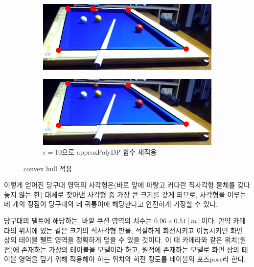 \documentclass[10pt]{oblivoir}
\newcommand{\textss}[1]{\scriptsize#1\normalsize}
\begin{document}
\begin{figure}[ht]
    \centering
    \begin{subfigure}{8cm}
        \includegraphics[width=\textwidth]{img/billiards-table-low-angle-convex.png}
        \caption{}
        \label{fig;table-lowangle-convexhull-src}
    \end{subfigure}
    \begin{subfigure}{8cm}
        \includegraphics[width=\textwidth]{img/billiards-table-low-angle-convex-aprx.png}
        \caption{$\epsilon=10$으로 approxPolyDP 함수 재적용}
        \label{fig;table-lowangle-convexhull-aprx}
    \end{subfigure}
    \caption{convex hull 적용}
    \label{fig;table-lowangle-convexhull}
\end{figure}

이렇게 얻어진 당구대 영역의 사각형은(바로 앞에 파랗고 커다란 직사각형 물체를 갖다 놓지 않는 한) 대체로 찾아낸 사각형 중 가장 큰 크기를 갖게 되므로, 사각형을 이루는 네 개의 정점이 당구대의 네 귀퉁이에 해당한다고 안전하게 가정할 수 있다.

당구대의 펠트에 해당하는, 바깥 쿠션 영역의 치수는 $0.96 \times 0.51[m]$이다. 만약 카메라의 위치에 있는 같은 크기의 직사각형 판을, 적절하게 회전시키고 이동시키면 화면 상의 테이블 펠트 영역을 정확하게 덮을 수 있을 것이다. 이 때 카메라와 같은 위치(원점)에 존재하는 가상의 테이블을 모델이라 하고, 원점에 존재하는 모델로 화면 상의 테이블 영역을 덮기 위해 적용해야 하는 위치와 회전 정도를 테이블의 포즈\textss{pose}라 한다.
\end{document}
